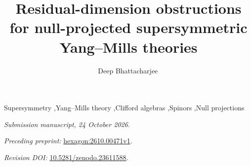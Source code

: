 \documentclass[preprint,11pt]{elsarticle}
\numberwithin{equation}{section}
\begin{document}
\begin{frontmatter}
\title{Residual-dimension obstructions for null-projected supersymmetric Yang--Mills theories}
\author[a,b]{Deep Bhattacharjee\,}
\address[a]{Formerly, Electro-Gravitational Space Propulsion Laboratory (EGSPL), Bhubaneswar, Odisha 751030, India}
\address[b]{Formerly, University of Calcutta, Senate House, 87/1 College Street, Kolkata 700073, West Bengal, India}
\begin{abstract}

\end{abstract}
\begin{keyword}
Supersymmetry \sep Yang--Mills theory \sep Clifford algebras \sep Spinors \sep Null projections
\end{keyword}
\end{frontmatter}
\noindent\begin{minipage}{\linewidth}
\textit{Submission manuscript, 24 October 2026.}\par
\textit{Preceding preprint:} \href{https://hexagonmath.org/2610.00471v1}{hexagon:2610.00471v1}.\par
\textit{Revision DOI:} \href{https://doi.org/10.5281/zenodo.23611588}{10.5281/zenodo.23611588}.
\end{minipage}\par\medskip



\end{document}
